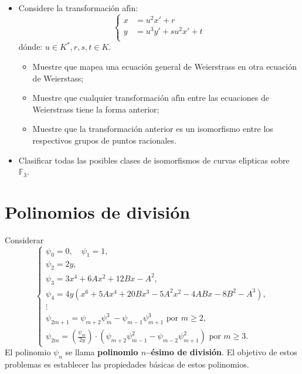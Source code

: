 \documentclass[a4paper,10pt]{article}
\begin{document}
\begin{itemize}
\begin{itemize}
$$\begin{array}{l}
 y\leftarrowtail y         \end{array}
\right.$$
asigna la ecuaci\'on anterior a lo siguiente:
$y^2+b_3x=x^3+b_4x+b_6$. Tambi\'en pruebe que lo anterior no es singular si y solo si $b_3\ne0$.
\item Muestre que una curva definida por $y^2+xy=x^3+b_2x^2+b_6$ ($b_6\ne0$) tiene un \'unico punto de orden $2$ mientras que
$y^2+b_3x=x^3+b_4x+b_6$ ($b_3\ne0$) no tiene puntos de orden $2$.
\item Enumere todas las posibles ecuaciones de Weierstrass no singulares (simplificadas)
sobre $\mathbb F_2$ y para cada uno de ellos calcular el grupo de puntos racionales sobre $\mathbb F_2$. Calcular, cuando sea posible, las isogenias entre las curvas anteriores.
\end{itemize}
\item Considere la transformaci\'on af\'{\i}n:
$$
\left\{\begin{aligned}
                x &= u^2x' + r          \\
                y &= u^3y' + su^2x' + t \\        
    \end{aligned}                       
\right.$$
d\'onde: $u\in K^*, r, s,t\in K$.
\begin{itemize}
\item Muestre que mapea una ecuaci\'on general de Weierstrass en otra ecuaci\'on de Weierstass;
\item Muestre que cualquier transformaci\'on af\'{\i}n entre las ecuaciones de Weierstrass tiene la forma anterior;
\item Muestre que la transformaci\'on anterior es un isomorfismo entre los respectivos grupos de puntos racionales.
\end{itemize}
\item Clasificar todas las posibles clases de isomorfismos de curvas el\'{\i}pticas sobre $\mathbb F_3$.
\end{itemize}
\newpage

\section{Polinomios de divisi\'on}
Considerar
$$\left\{\begin{array}{l}
\psi _{{0}}=0,\quad  \psi _{{1}}=1,\\
\psi _{{2}}=2y,\\
\psi _{{3}}=3x^{{4}}+6Ax^{{2}}+12Bx-A^{{2}},\\
\psi _{{4}}=4y(x^{{6}}+5Ax^{{4}}+20Bx^{{3}}-5A^{{2}}x^{{2}}-4ABx-8B^{{2}}-A^{{3}}),\\
\vdots\\
\psi _{{2m+1}}=\psi _{{m+2}}\psi _{{m}}^{{3}}-\psi _{{m-1}}\psi _{{m+1}}^{{3}}{\text{ por }}m\geq 2,\\
\psi _{{2m}}=\left({\frac {\psi _{{m}}}{2y}}\right)\cdot (\psi _{{m+2}}\psi _{{m-1}}^{{2}}-\psi _{{m-2}}\psi _{{m+1}}^{{2}}){\text{ por }}m\geq 3.
\end{array}\right.
$$
El polinomio $\psi_n$ se llama \textbf{polinomio $n$--\'esimo de divisi\'on}.
El objetivo de estos problemas es establecer las propiedades b\'asicas de estos polinomios.
\end{document}

